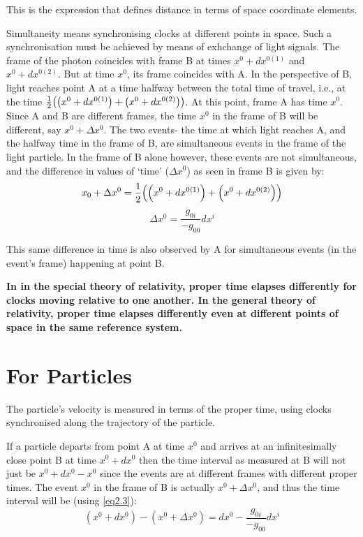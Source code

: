 \documentclass[12pt, letterpaper]{report}
\begin{document}
This is the expression that defines distance in terms of space coordinate elements.

Simultaneity means synchronising clocks at different points in space. Such a synchronisation must be achieved by means of exhchange of light signals. The frame of the photon coincides with frame B at times $x^0+dx^{0(1)}$ and $x^0+dx^{0(2)}$. But at time $x^0$, its frame coincides with A. In the perspective of B, light reaches point A at a time halfway between the total time of travel, i.e., at the time $\frac{1}{2}\qty(\qty(x^0+dx^{0(1)})+\qty(x^0+dx^{0(2)}))$. At this point, frame A has time $x^0$. Since A and B are different frames, the time $x^0$ in the frame of B will be different, say $x^0+\Delta x^0$. The two events- the time at which light reaches A, and the halfway time in the frame of B, are simultaneous events in the frame of the light particle. In the frame of B alone however, these events are not simultaneous, and the difference in values of `time' ($\Delta x^0$) as seen in frame B is given by: 
$$x_0+\Delta x^0= \frac{1}{2}\qty(\qty(x^0+dx^{0(1)})+\qty(x^0+dx^{0(2)}))$$
\begin{equation}
    \Delta x^0= \frac{g_{0i}}{-g_{00}}dx^i \label{eq2.3}
\end{equation}

This same difference in time is also observed by A for simultaneous events (in the event's frame) happening at point B. 

\textbf{In in the special theory of relativity, proper time elapses differently for clocks moving relative to one another. In the  general theory of relativity, proper time elapses differently even at different points of space in the same reference system.}

\section{For Particles}

The particle's velocity is measured in terms of the proper time, using clocks synchronised along the trajectory of the particle. 

If a particle departs from point A at time $x^0$ and arrives at an infinitesimally close point B at time $x^0+dx^0$ then the time interval as measured at B will not just be $x^0+dx^0-x^0$ since the events are at different frames with different proper times. The event $x^0$ in the frame of B is actually $x^0+\Delta x^0$, and thus the time interval will be (using \cref{eq2.3}): 
\[(x^0+dx^0)- (x^0+\Delta x^0)= dx^0-\frac{g_{0i}}{-g_{00}}dx^i\]
\end{document}
